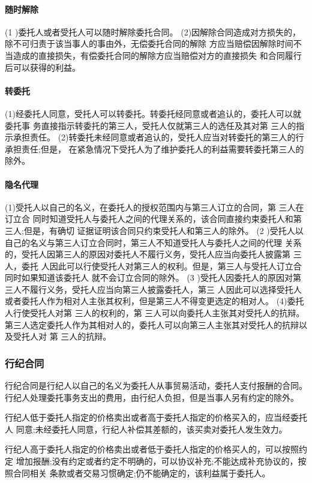 \documentclass[UTF8,12pt]{ctexart}
\numberwithin{equation}{section} %
\numberwithin{figure}{section}
\numberwithin{table}{section}
\begin{document}
	\paragraph{随时解除}
	(1 )委托人或者受托人可以随时解除委托合同。 (2)因解除合同造成对方损失的，除不可归责于该当事人的事由外，无偿委托合同的解除 方应当赔偿因解除时间不当造成的直接损失，有偿委托合同的解除方应当赔偿对方的直接损失 和合同履行后可以获得的利益。
	
	\paragraph{转委托}
	 (1)经委托人同意，受托人可以转委托。转委托经同意或者追认的，委托人可以就委托事 务直接指示转委托的第三人，受托人仅就第三人的选任及其对第 三人的指示承担责任。 (2)转委托未经同意或者追认的，受托人应当对转委托的第三人的行 承担责任;但是， 在紧急情况下受托人为了维护委托人的利益需要转委托第三人的除外。
	
	\paragraph{隐名代理}
	(1)受托人以自己的名义，在委托人的授权范围内与第三人订立的合同，第 三人在订立合 同时知道受托人与委托人之间的代理关系的，该合同直接约束委托人和第三人;但是，有确切 证据证明该合同只约束受托人和第三人的除外。
	(2 )受托人以自己的名义与第三人订立合同时，第三人不知道受托人与委托人之间的代理 关系的，受托人因第三人的原因对委托人不履行义务，受托人应当向委托人披露第 三人，委托 人因此可以行使受托人对第三人的权利。但是，第三人与受托人订立合同时如果知道该委托人 就不会订立合同的除外。
	(3 )受托人因委托人的原因对第三人不履行义务，受托人应当向第三人披露委托人，第三 人因此可以选择受托人或者委托人作为相对人主张其权利，但是第三人不得变更选定的相对人。 (4)委托人行使受托人对第 三人的权利的，第 三人可以向委托人主张其对受托人的抗辩。 第三人选定委托人作为其相对人的，委托人可以向第三人主张其对受托人的抗辩以及受托人对 第 三人的抗辩。
	
	\subsubsection{行纪合同}
	行纪合同是行纪人以自己的名义为委托人从事贸易活动，委托人支付报酬的合同。行纪人处理委托事务支出的费用，由行纪人负担，但是当事人另有约定的除外。
	
	行纪人低于委托人指定的价格卖出或者高于委托人指定的价格买入的，应当经委托人 同意;未经委托人同意，行纪人补偿其差额的，该买卖对委托人发生效力。
	
	行纪人高于委托人指定的价格卖出或者低于委托人指定的价格买人的，可以按照约定 增加报酬;没有约定或者约定不明确的，可以协议补充;不能达成补充协议的，按照合同相关 条款或者交易习惯确定;仍不能确定的，该利益属于委托人。
	
\end{document}
